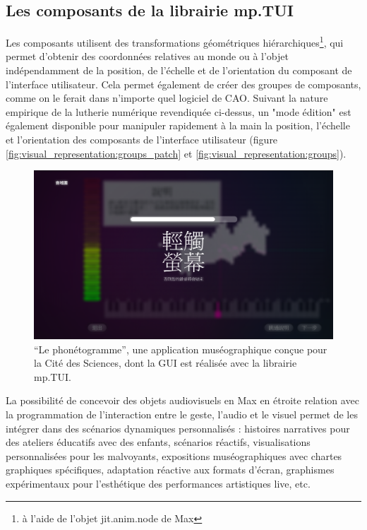 \subsection{Les composants de la librairie mp.TUI}

\noindent Les composants utilisent des transformations géométriques hiérarchiques\footnote{à l'aide de l'objet jit.anim.node de Max}, qui permet d'obtenir des coordonnées relatives au monde ou à l'objet indépendamment de la position, de l'échelle et de l'orientation du composant de l'interface utilisateur. Cela permet également de créer des groupes de composants, comme on le ferait dans n'importe quel logiciel de CAO. Suivant la nature empirique de la lutherie numérique revendiquée ci-dessus, un "mode édition" est également disponible pour manipuler rapidement à la main la position, l'échelle et l'orientation des composants de l'interface utilisateur (figure \ref{fig:visual_representation:groups_patch} et \ref{fig:visual_representation:groups}).

\begin{figure}[!htbp]
	\captionsetup{format=plain}%
	\includegraphics[width=\textwidth]{gfx/06_visual_representation/Phonetogramme.png}
	\caption[``Le phonétogramme'', une application réalisée à l'aide de la librairie mp.TUI]{``Le phonétogramme'', une application muséographique conçue pour la Cité des Sciences, dont la GUI est réalisée avec la librairie mp.TUI.}
	\label{fig:visual_representation:phonetogramme}
\end{figure}

\noindent La possibilité de concevoir des objets audiovisuels en Max en étroite relation avec la programmation de l'interaction entre le geste, l'audio et le visuel permet de les intégrer dans des scénarios dynamiques personnalisés : histoires narratives pour des ateliers éducatifs avec des enfants, scénarios réactifs, visualisations personnalisées pour les malvoyants, expositions muséographiques avec chartes graphiques spécifiques, adaptation réactive aux formats d'écran, graphismes expérimentaux pour l'esthétique des performances artistiques live, etc.


